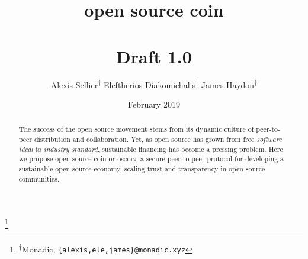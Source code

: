 \documentclass[a4paper, oneside, 10pt, final]{amsart}
\begin{document}
\title[open source coin]{open source coin \\ \vspace{0.5em} \\ {\tiny Draft 1.0}}
\author{\Small Alexis Sellier\textsuperscript{$\dagger$} \qquad Eleftherios Diakomichalis\textsuperscript{$\dagger$} \qquad James Haydon\textsuperscript{$\dagger$}}
\date{February 2019}

\thanks{\textsuperscript{$\dagger$}Monadic, \texttt{\{alexis,ele,james\}@monadic.xyz}}

\begin{abstract}
The success of the open source movement stems from its dynamic culture of
peer-to-peer distribution and collaboration. Yet, as open source has grown from
free \emph{software ideal} to \emph{industry standard}, sustainable financing
has become a pressing problem.  Here we propose open source coin or
\textsc{oscoin}, a secure peer-to-peer protocol for developing a sustainable
open source economy, scaling trust and
transparency in open source communities.

\end{abstract}

\maketitle
\end{document}

